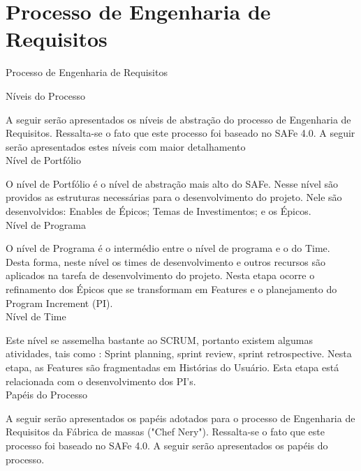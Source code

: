 
\chapter[Processo de Engenharia de Requisitos]{Processo de Engenharia de Requisitos}

\large{Processo de Engenharia de Requisitos\\}




\large{Níveis do Processo\\}

\tab A seguir serão apresentados os níveis de abstração do processo de Engenharia de Requisitos. Ressalta-se o fato que este processo foi baseado no SAFe 4.0. A seguir serão apresentados estes níveis com maior detalhamento\\ 


\large{Nível de Portfólio\\}

\tab O nível de Portfólio é o nível de abstração mais alto do SAFe. Nesse nível são providos as estruturas necessárias para o desenvolvimento do projeto.  Nele são desenvolvidos: Enables de Épicos; Temas de Investimentos; e os Épicos. \\

 \large{Nível de Programa\\}

 \tab O nível de Programa é o intermédio entre o nível de programa e o do Time. Desta forma, neste nível os times de desenvolvimento e outros recursos são aplicados na tarefa de desenvolvimento do projeto.  Nesta etapa ocorre o refinamento dos Épicos que se transformam em Features e o planejamento do Program Increment (PI).\\

\large{Nível de Time\\}

\tab Este nível se assemelha bastante ao SCRUM,  portanto existem algumas atividades, tais como : Sprint planning, sprint review, sprint retrospective. Nesta etapa, as Features são fragmentadas em Histórias do Usuário. Esta etapa está relacionada com o desenvolvimento dos PI’s. \\

\large{Papéis do Processo\\}

\tab A seguir serão apresentados os papéis adotados para o processo de Engenharia de Requisitos da Fábrica de massas ("Chef Nery"). Ressalta-se o fato que este processo foi baseado no SAFe 4.0. A seguir serão apresentados os papéis do processo.\\

